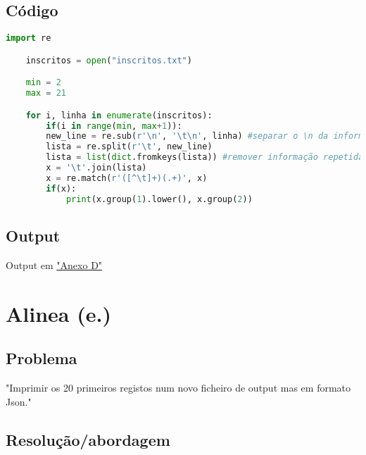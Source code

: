 \documentclass[11pt,a4paper]{report}
\begin{document}
	\subsection{Código}
	\begin{lstlisting}[language=python]
    import re

    inscritos = open("inscritos.txt")

    min = 2
    max = 21   

    for i, linha in enumerate(inscritos):
        if(i in range(min, max+1)):
        new_line = re.sub(r'\n', '\t\n', linha) #separar o \n da informação final
        lista = re.split(r'\t', new_line)
        lista = list(dict.fromkeys(lista)) #remover informação repetida
        x = '\t'.join(lista)
        x = re.match(r'([^\t]+)(.+)', x)
        if(x):
            print(x.group(1).lower(), x.group(2))
    \end{lstlisting}
    
    \subsection{Output}
        Output em \hyperlink{Anexo D}{"Anexo D"}
    
        
    

\pagebreak

    \section{Alinea (e.)}
	\subsection{Problema}
	"Imprimir os 20 primeiros registos num novo ficheiro de output mas em formato Json."
	
	\subsection{Resolução/abordagem}
    
	
\end{document}
